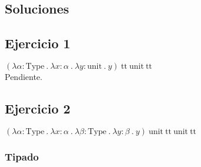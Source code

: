 \documentclass[a4paper]{article}
\begin{document}
\begin{landscape}


\newpage

\section{Soluciones}




\subsection{Ejercicio 1}

$(\lambda \alpha : \text{Type}\ .\
  \lambda x : \alpha\ .\
  \lambda y : \text{unit}\ .\
  y)\
 \text{tt}\ \text{unit}\ \text{tt}$\\

Pendiente.




\newpage

\subsection{Ejercicio 2}

$(\lambda \alpha : \text{Type}\ .\
  \lambda x : \alpha\ .\
  \lambda \beta : \text{Type}\ .\
  \lambda y : \beta\ .\
  y)\
 \text{unit}\ \text{tt}\ \text{unit}\ \text{tt}$


\subsubsection{Tipado}


\end{landscape}
\end{document}

